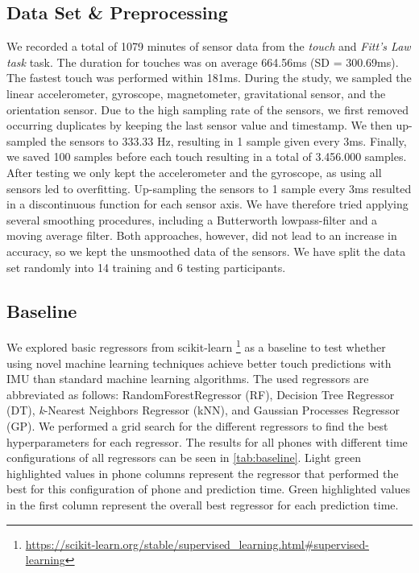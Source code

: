 \subsection{Data Set \& Preprocessing}
\label{sec:prepro}

We recorded a total of 1079 minutes of sensor data from the \textit{touch} and \textit{Fitt's Law task} task.
The duration for touches was on average 664.56ms (SD = 300.69ms).
The fastest touch was performed within 181ms.
During the study, we sampled the linear accelerometer, gyroscope, magnetometer, gravitational sensor, and the orientation sensor.
Due to the high sampling rate of the sensors, we first removed occurring duplicates by keeping the last sensor value and timestamp.
We then up-sampled the sensors to 333.33 Hz, resulting in 1 sample given every 3ms. 
Finally, we saved 100 samples before each touch resulting in a total of 3.456.000 samples.
After testing we only kept the accelerometer and the gyroscope, as using all sensors led to overfitting.
Up-sampling the sensors to 1 sample every 3ms resulted in a discontinuous function for each sensor axis. 
We have therefore tried applying several smoothing procedures, including a Butterworth lowpass-filter and a moving average filter.
Both approaches, however, did not lead to an increase in accuracy, so we kept the unsmoothed data of the sensors.
We have split the data set randomly into 14 training and 6 testing participants.

\subsection{Baseline}
We explored basic regressors from scikit-learn \footnote{\url{https://scikit-learn.org/stable/supervised\_learning.html\#supervised-learning}} as a baseline to test whether using novel machine learning techniques achieve better touch predictions with IMU than standard machine learning algorithms.
The used regressors are abbreviated as follows: RandomForestRegressor (RF), Decision Tree Regressor (DT), \textit{k}-Nearest Neighbors Regressor (kNN), and Gaussian Processes Regressor (GP).
We performed a grid search for the different regressors to find the best hyperparameters for each regressor.
The results for all phones with different time configurations of all regressors can be seen in \cref{tab:baseline}.
Light green highlighted values in phone columns represent the regressor that performed the best for this configuration of phone and prediction time.
Green highlighted values in the first column represent the overall best regressor for each prediction time.

